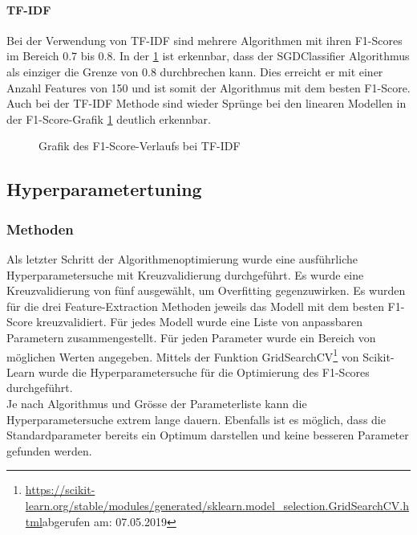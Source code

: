 \paragraph{TF-IDF}
Bei der Verwendung von TF-IDF sind mehrere Algorithmen mit ihren F1-Scores im Bereich 0.7 bis 0.8.
In der \cref{abb:tfidf-f1} ist erkennbar, dass der SGDClassifier Algorithmus als einziger die Grenze von 0.8 durchbrechen kann.
Dies erreicht er mit einer Anzahl Features von 150 und ist somit der Algorithmus mit dem besten F1-Score.\\
Auch bei der TF-IDF Methode sind wieder Sprünge bei den linearen Modellen in der F1-Score-Grafik \cref{abb:tfidf-f1} deutlich erkennbar.
\begin{figure}[H]	
	\setlength{\fboxsep}{0.3pt} 
	\setlength{\fboxrule}{0.3pt} 
	\caption{Grafik des F1-Score-Verlaufs bei TF-IDF}
	\label{abb:tfidf-f1}
\end{figure}
\subsection{Hyperparametertuning}
\subsubsection{Methoden}
Als letzter Schritt der Algorithmenoptimierung wurde eine ausführliche Hyperparametersuche mit Kreuzvalidierung durchgeführt.
Es wurde eine Kreuzvalidierung von fünf ausgewählt, um Overfitting gegenzuwirken.
Es wurden für die drei Feature-Extraction Methoden jeweils das Modell mit dem besten F1-Score kreuzvalidiert.
Für jedes Modell wurde eine Liste von anpassbaren Parametern zusammengestellt.
Für jeden Parameter wurde ein Bereich von möglichen Werten angegeben.
Mittels der Funktion \glqq GridSearchCV\grqq{}\footnote{\url{https://scikit-learn.org/stable/modules/generated/sklearn.model_selection.GridSearchCV.html}abgerufen am: 07.05.2019} von Scikit-Learn wurde die Hyperparametersuche für die Optimierung des F1-Scores durchgeführt.\\
Je nach Algorithmus und Grösse der Parameterliste kann die Hyperparametersuche extrem lange dauern.
Ebenfalls ist es möglich, dass die Standardparameter bereits ein Optimum darstellen und keine besseren Parameter gefunden werden.
